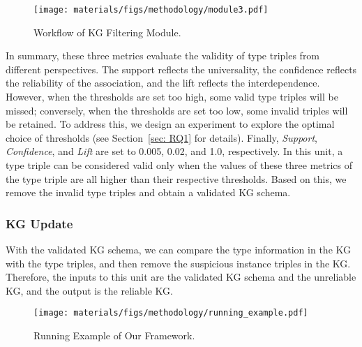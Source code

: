 \begin{figure}[t]
    \centering
\texttt{[image: materials/figs/methodology/module3.pdf]}
    \caption{Workflow of KG Filtering Module.}
    \label{fig: module3}
    \vspace{-4mm}
\end{figure}


In summary, these three metrics evaluate the validity of type triples from different perspectives.
The support reflects the universality, the confidence reflects the reliability of the association, and the lift reflects the interdependence.
However, when the thresholds are set too high, some valid type triples will be missed;
conversely, when the thresholds are set too low, some invalid triples will be retained.
To address this, we design an experiment to explore the optimal choice of thresholds (see Section~\ref{sec: RQ1} for details).
Finally, \textit{Support}, \textit{Confidence}, and \textit{Lift} are set to 0.005, 0.02, and 1.0, respectively.
In this unit, a type triple can be considered valid only when the values of these three metrics of the type triple are all higher than their respective thresholds.
Based on this, we remove the invalid type triples and obtain a validated KG schema.

\subsubsection{KG Update}
With the validated KG schema, we can compare the type information in the KG with the type triples, and then remove the suspicious instance triples in the KG.
Therefore, the inputs to this unit are the validated KG schema and the unreliable KG, and the output is the reliable KG.

\begin{figure*}[t]
    \centering
    \texttt{[image: materials/figs/methodology/running\_example.pdf]}
    \caption{Running Example of Our Framework.}
    \label{fig: running example}
\end{figure*}

